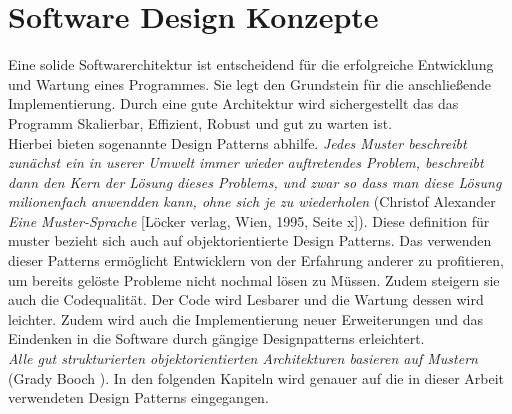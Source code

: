 \section{Software Design Konzepte}
Eine solide Softwarerchitektur ist entscheidend für die erfolgreiche Entwicklung und Wartung eines Programmes. Sie legt den Grundstein für die anschließende Implementierung. Durch eine gute Architektur wird sichergestellt das das Programm Skalierbar, Effizient, Robust und gut zu warten ist.\\
Hierbei bieten sogenannte Design Patterns abhilfe. \textit{Jedes Muster beschreibt zunächst ein in userer Umwelt immer wieder auftretendes Problem, beschreibt dann den Kern der Lösung dieses Problems, und zwar so dass man diese Lösung milionenfach anwendden kann, ohne sich je zu wiederholen} (Christof Alexander \textit{Eine Muster-Sprache} [Löcker verlag, Wien, 1995, Seite x]). Diese definition für muster bezieht sich auch auf objektorientierte Design Patterns. Das verwenden dieser Patterns ermöglicht Entwicklern von der Erfahrung anderer zu profitieren, um bereits gelöste Probleme nicht nochmal lösen zu Müssen. Zudem steigern sie auch die Codequalität. Der Code wird Lesbarer und die Wartung dessen wird leichter. Zudem wird auch die Implementierung neuer Erweiterungen und das Eindenken in die Software durch gängige Designpatterns erleichtert. \cite[S.25 ff]{DesignPatterns}\\
\textit{Alle gut strukturierten objektorientierten Architekturen basieren auf Mustern} (Grady Booch \cite[S.21]{DesignPatterns}).
In den folgenden Kapiteln wird genauer auf die in dieser Arbeit verwendeten Design Patterns eingegangen.      

